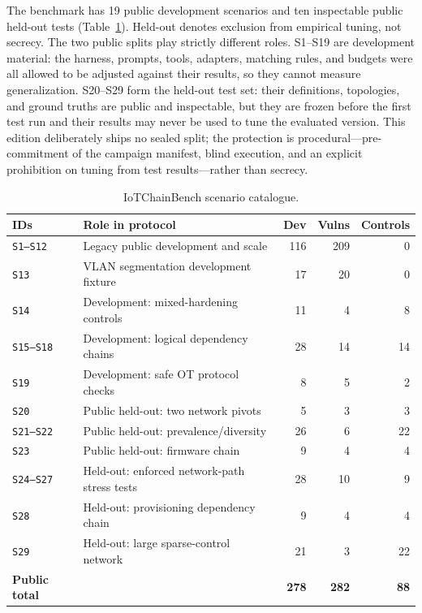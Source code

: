 \documentclass[conference,compsoc]{IEEEtran}
\newcommand{\systemname}{IoTChainBench\xspace}
\begin{document}
The benchmark has 19 public development scenarios and ten inspectable public held-out tests (Table~\ref{tab:scenarios}). Held-out denotes exclusion from empirical tuning, not secrecy. The two public splits play strictly different roles. S1--S19 are development material: the harness, prompts, tools, adapters, matching rules, and budgets were all allowed to be adjusted against their results, so they cannot measure generalization. S20--S29 form the held-out test set: their definitions, topologies, and ground truths are public and inspectable, but they are frozen before the first test run and their results may never be used to tune the evaluated version. This edition deliberately ships no sealed split; the protection is procedural---pre-commitment of the campaign manifest, blind execution, and an explicit prohibition on tuning from test results---rather than secrecy.

\begin{table}[h!]
\centering
\caption{\systemname{} scenario catalogue.}
\label{tab:scenarios}
\scriptsize
\setlength{\tabcolsep}{3pt}
\begin{tabular}{@{}llrrr@{}}
\toprule
IDs & Role in protocol & Dev & Vulns & Controls \\
\midrule
\texttt{S1--S12} & Legacy public development and scale & 116 & 209 & 0 \\
\texttt{S13} & VLAN segmentation development fixture & 17 & 20 & 0 \\
\texttt{S14} & Development: mixed-hardening controls & 11 & 4 & 8 \\
\texttt{S15--S18} & Development: logical dependency chains & 28 & 14 & 14 \\
\texttt{S19} & Development: safe OT protocol checks & 8 & 5 & 2 \\
\texttt{S20} & Public held-out: two network pivots & 5 & 3 & 3 \\
\texttt{S21--S22} & Public held-out: prevalence/diversity & 26 & 6 & 22 \\
\texttt{S23} & Public held-out: firmware chain & 9 & 4 & 4 \\
\texttt{S24--S27} & Held-out: enforced network-path stress tests & 28 & 10 & 9 \\
\texttt{S28} & Held-out: provisioning dependency chain & 9 & 4 & 4 \\
\texttt{S29} & Held-out: large sparse-control network & 21 & 3 & 22 \\
\midrule
\textbf{Public total} & & \textbf{278} & \textbf{282} & \textbf{88} \\
\bottomrule
\end{tabular}
\end{table}
\end{document}
